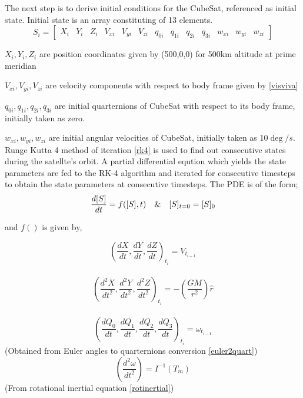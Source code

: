 The next step is to derive initial conditions for the CubeSat, referenced as initial state. Initial state is an array constituting of 13 elements. $$S_i = [\begin{array}{lllllllllllll}
	X_i & Y_i & Z_i & V_{xi} & V_{yi} & V_{zi} & q_{0i} & q_{1i} & q_{2i} & q_{3i} & w_{xi} & w_{yi} & w_{zi}
\end{array}]$$

$X_i,Y_i,Z_i$ are position coordinates given by (500,0,0) for 500km altitude at prime meridian

$V_{xi},V_{yi},V_{zi}$ are velocity components with respect to body frame given by \ref{visviva}

$q_{0i},q_{1i},q_{2i},q_{3i}$ are initial quarternions of CubeSat with respect to its body frame, initially taken as zero.

$w_{xi},w_{yi},w_{zi}$ are initial angular velocities of CubeSat, initially taken as 10$\deg/s$.\\

Runge Kutta 4 method of iteration \ref{rk4} is used to find out consecutive states during the satellte's orbit. A partial differential eqution which yields the state parameters are fed to the RK-4 algorithm and iterated for consecutive timesteps to obtain the state parameters at consecutive timesteps. The PDE is of the form;$$\frac{d[S]}{dt} = f([S],t) \text{\hspace{10pt}\&\hspace{10pt}} [S]_{t=0} = [S]_0$$

\noindent and $f()$ is given by,

$$\left(\frac{dX}{dt},\frac{dY}{dt},\frac{dZ}{dt}\right)_{t_i} = V_{t_{i-1}}$$\\
$$\left(\frac{d^2X}{dt^2},\frac{d^2Y}{dt^2},\frac{d^2Z}{dt^2}\right)_{t_i} = -\left(\frac{GM}{r^2}\right)\hat{r}$$\\
$$\left(\frac{dQ_0}{dt},\frac{dQ_1}{dt},\frac{dQ_2}{dt},\frac{dQ_3}{dt}\right)_{t_i} = \omega_{t_{i-1}}$$
\hspace{35pt} (Obtained from Euler angles to quarternions conversion \ref{euler2quart})\\
$$\left(\frac{d^2\omega}{dt^2}\right) = I^{-1}(T_m)$$
\hspace{100pt} (From rotational inertial equation \ref{rotinertial})\\

